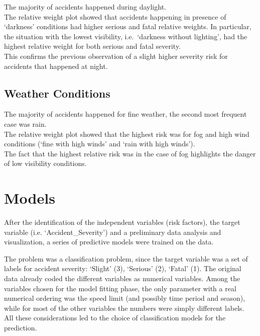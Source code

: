 \documentclass[11pt]{article}
\begin{document}
    \begin{center}
    \end{center}

The majority of accidents happened during daylight.\\
The relative weight plot showed that accidents happening in presence of `darkness' conditions had higher serious and fatal relative weights. In particular, the situation with the lowest visibility, i.e.~`darkness without lighting', had the highest relative weight for both serious and fatal severity.\\
This confirms the previous observation of a slight higher severity risk for accidents that happened at night.

    \hypertarget{weather-conditions}{%
\subsection{Weather Conditions}\label{weather-conditions}}

    \begin{center}
    \end{center}

The majority of accidents happened for fine weather, the second most frequent case was rain.\\
The relative weight plot showed that the highest risk was for fog and high wind conditions (`fine with high winds' and `rain with high winds').\\
The fact that the highest relative risk was in the case of fog highlights the danger of low visibility conditions.

    \hypertarget{model}{%
\section{Models}\label{model}}

After the identification of the independent variables (risk factors), the target variable (i.e. `Accident\_Severity') and a preliminary data analysis and visualization, a series of predictive models were trained on the data.

The problem was a classification problem, since the target variable was a set of labels for accident severity: `Slight' (3), `Serious' (2), `Fatal' (1). The original data already coded the different variables as numerical variables. Among the variables chosen for the model fitting phase, the only parameter with a real numerical ordering was the speed limit (and possibly time period and season), while for most of the other variables the numbers were simply different labels.\\
All these considerations led to the choice of classification models for the prediction.
\end{document}
